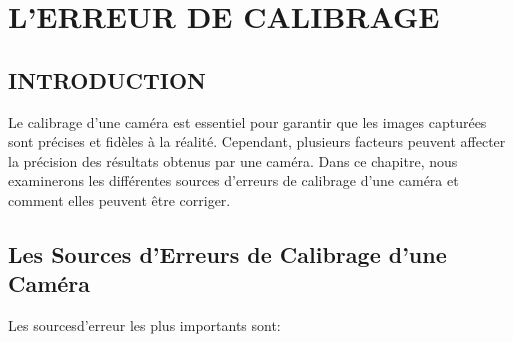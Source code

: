 \chapter{L'ERREUR DE CALIBRAGE}
\begin{spacing}{1.2}
	\minitoc
	\thispagestyle{MyStyle}
\end{spacing}
\newpage

\section{INTRODUCTION}

Le calibrage d'une caméra est essentiel pour garantir que les images capturées sont précises et fidèles à la réalité. Cependant, plusieurs facteurs peuvent affecter la précision des résultats obtenus par une caméra. Dans ce chapitre, nous examinerons les différentes sources d'erreurs de calibrage d'une caméra et comment elles peuvent être corriger.

\section{Les Sources d'Erreurs de Calibrage d'une Caméra}

 Les sourcesd'erreur les plus importants sont:

